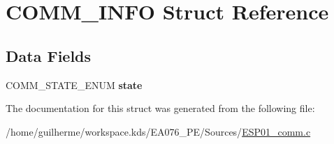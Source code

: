 \hypertarget{struct_c_o_m_m___i_n_f_o}{}\section{C\+O\+M\+M\+\_\+\+I\+N\+FO Struct Reference}
\label{struct_c_o_m_m___i_n_f_o}
\subsection*{Data Fields}
\begin{DoxyCompactItemize}
\item 
\mbox{\label{struct_c_o_m_m___i_n_f_o_a7fbaab04ae614652b8575097778ed476}} 
C\+O\+M\+M\+\_\+\+S\+T\+A\+T\+E\+\_\+\+E\+N\+UM {\bfseries state}
\end{DoxyCompactItemize}


The documentation for this struct was generated from the following file\+:\begin{DoxyCompactItemize}
\item 
/home/guilherme/workspace.\+kds/\+E\+A076\+\_\+\+P\+E/\+Sources/\hyperlink{_e_s_p01__comm_8c}{E\+S\+P01\+\_\+comm.\+c}\end{DoxyCompactItemize}
